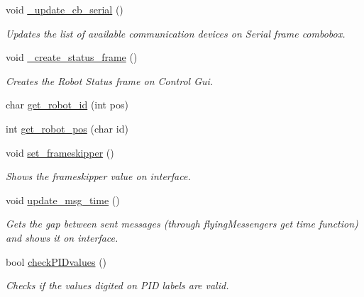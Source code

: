 \begin{DoxyCompactItemize}
void \hyperlink{class_control_g_u_i_ac1c2a324c056d78dae8e2a0123855dc1}{\+\_\+update\+\_\+cb\+\_\+serial} ()
\begin{DoxyCompactList}\small\item\em Updates the list of available communication devices on \textquotesingle{}Serial\textquotesingle{} frame combobox. \end{DoxyCompactList}\item 
void \hyperlink{class_control_g_u_i_ae1e6b2a93d61568a7bf5cdc5870e1f6c}{\+\_\+create\+\_\+status\+\_\+frame} ()
\begin{DoxyCompactList}\small\item\em Creates the \textquotesingle{}Robot Status\textquotesingle{} frame on Control Gui. \end{DoxyCompactList}\item 
char \hyperlink{class_control_g_u_i_ae165819cbfce64d6604aac836faf9f1a}{get\+\_\+robot\+\_\+id} (int pos)
\item 
int \hyperlink{class_control_g_u_i_a73461b797a120e541d151ab0d50f0537}{get\+\_\+robot\+\_\+pos} (char id)
\item 
void \hyperlink{class_control_g_u_i_ab3017ac43a33b7dd0a79db25e354fcf2}{set\+\_\+frameskipper} ()
\begin{DoxyCompactList}\small\item\em Shows the frameskipper value on interface. \end{DoxyCompactList}\item 
void \hyperlink{class_control_g_u_i_a7cdf0036f7b6c8ad8c9fb2a1c36e9c39}{update\+\_\+msg\+\_\+time} ()
\begin{DoxyCompactList}\small\item\em Gets the gap between sent messages (through flying\+Messenger\textquotesingle{}s get time function) and shows it on interface. \end{DoxyCompactList}\item 
bool \hyperlink{class_control_g_u_i_a99b0828efc587f0f29d58eeb708f266e}{check\+P\+I\+Dvalues} ()
\begin{DoxyCompactList}\small\item\em Checks if the values digited on P\+ID labels are valid. \end{DoxyCompactList}\end{DoxyCompactItemize}
